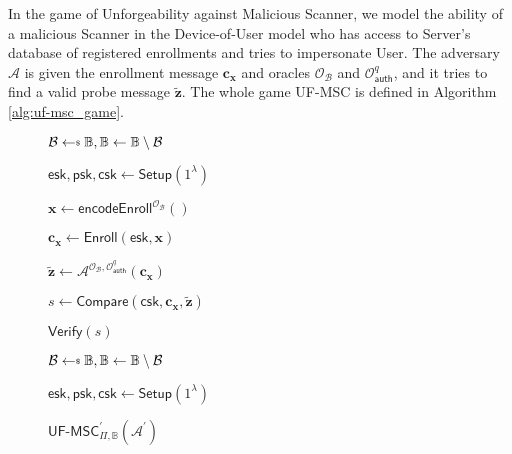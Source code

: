 In the game of Unforgeability against Malicious Scanner, we model the ability of a malicious \textsf{Scanner} in the Device-of-User model who has access to \textsf{Server}'s database of registered enrollments and tries to impersonate \textsf{User}. The adversary $\mathcal{A}$ is given the enrollment message $\mathbf{c_x}$ and oracles $\mathcal{O}_{\mathcal{B}}$ and $\mathcal{O}_\textsf{auth}^q$, and it tries to find a valid probe message $\mathbf{\tilde{z}}$. The whole game \textsf{UF-MSC} is defined in Algorithm \ref{alg:uf-msc_game}.

\begin{figure}[h]
\centering
\vspace*{-\multicolsep}
\begin{multicols}{2}
	\begin{minipage}[t]{0.9\linewidth}
	\centering
	\begin{algorithm}[H]
	\caption{$\textsf{UF-MSC}_{\Pi, \mathbb{B}}(\mathcal{A})$}
	\label{alg:uf-msc_game}
	\begin{algorithmic}[1]
		\State $\mathcal{B} \getsdollar \mathbb{B}, \mathbb{B} \gets \mathbb{B} \setminus \mathcal{B}$

		\State $\textsf{esk}, \textsf{psk}, \textsf{csk} \gets \textsf{Setup}(1^\lambda)$

		\State $\mathbf{x} \gets \textsf{encodeEnroll}^{\mathcal{O}_{\mathcal{B}}}()$

		\State $\mathbf{c_x} \gets \textsf{Enroll}(\textsf{esk}, \mathbf{x})$

		\State ${\mathbf{\tilde{z}}} \gets \mathcal{A}^{ \mathcal{O}_{\mathcal{B}}, \mathcal{O}_\textsf{auth}^q } ( \mathbf{c_x} )$

		\State $s \gets \textsf{Compare}( \textsf{csk}, \mathbf{c_x}, \mathbf{\tilde{z}} )$

		\State \Return $\textsf{Verify}(s)$
	\end{algorithmic}
	\end{algorithm}
	\end{minipage}
	
	\begin{minipage}[t]{0.9\linewidth}
	\centering
	\begin{algorithm}[H]
	\caption{$\textsf{UF-MSC}^\prime_{\Pi, \mathbb{B}}(\mathcal{A^\prime})$}
	\label{alg:uf-msc-prime_game}
	\begin{algorithmic}[1]
		\State $\mathcal{B} \getsdollar \mathbb{B}, \mathbb{B} \gets \mathbb{B} \setminus \mathcal{B}$

		\State $\textsf{esk}, \textsf{psk}, \textsf{csk} \gets \textsf{Setup}(1^\lambda)$


\end{algorithmic}
\end{algorithm}
\end{minipage}
\end{multicols}
\end{figure}
